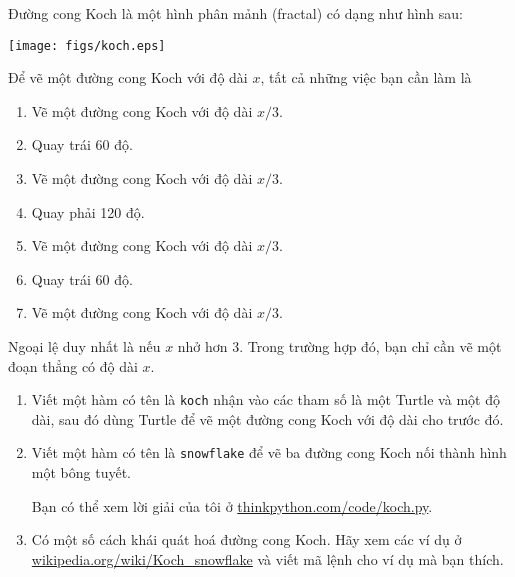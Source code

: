 \documentclass[11pt]{book}
\begin{document}
\begin{ex}


Đường cong Koch là một hình phân mảnh (fractal) có dạng như hình sau:

\beforefig
\centerline{\texttt{[image: figs/koch.eps]}}
\afterfig

Để vẽ một đường cong Koch với độ dài $x$, tất cả những việc bạn cần làm là 

\begin{enumerate}

\item Vẽ một đường cong Koch với độ dài $x/3$.

\item Quay trái 60 độ.

\item Vẽ một đường cong Koch với độ dài $x/3$.

\item Quay phải 120 độ.

\item Vẽ một đường cong Koch với độ dài $x/3$.

\item Quay trái 60 độ.

\item Vẽ một đường cong Koch với độ dài $x/3$.

\end{enumerate}

Ngoại lệ duy nhất là nếu $x$ nhở hơn 3.  Trong trường hợp đó,
bạn chỉ cần vẽ một đoạn thẳng có độ dài $x$.

\begin{enumerate}

\item Viết một hàm có tên là {\tt koch} nhận vào các tham số
là một Turtle và một độ dài, sau đó dùng Turtle để vẽ một đường
cong Koch với độ dài cho trước đó.

\item Viết một hàm có tên là {\tt snowflake} để vẽ ba đường cong 
Koch nối thành hình một bông tuyết.

Bạn có thể xem lời giải của tôi ở \url{thinkpython.com/code/koch.py}.

\item Có một số cách khái quát hoá đường cong Koch. Hãy xem các
ví dụ ở \url{wikipedia.org/wiki/Koch_snowflake} và viết mã lệnh cho
ví dụ mà bạn thích.

\end{enumerate}
\end{ex}
\end{document}
